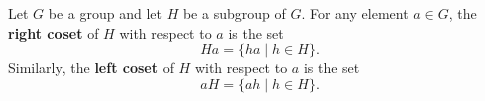 Let $G$ be a group and let $H$ be a subgroup of $G$. For any element $a \in G$, the \textbf{right coset} of $H$ with respect to $a$ is the set
$$Ha = \{ha \mid h \in H\}.$$
Similarly, the \textbf{left coset} of $H$ with respect to $a$ is the set
$$aH = \{ah \mid h \in H\}.$$
